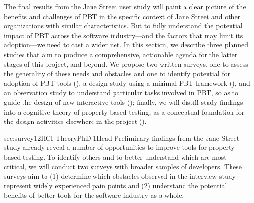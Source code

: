 
\iflater{}\fi


\iflater{}\fi

The final results from the Jane Street user study\iflater{}\fi{} will
paint a clear
picture of the benefits and challenges of PBT in the specific context
of Jane Street and other organizations with similar characteristics.  But to
fully understand the potential impact of PBT across the software
industry---and the factors that may limit its adoption---we need to
cast a wider net.
%
In this section, we describe three planned studies that aim
to produce a comprehensive, actionable
agenda for the latter stages of this project, and beyond.  We propose two
written surveys, one to assess the generality of these needs and obstacles
and one to identify potential for adoption of PBT tools
(), a design study using a minimal PBT
framework (), and an observation study to understand
particular tasks involved in PBT, so as to guide the design of new
interactive tools
(); finally, we will distill study findings
into a cognitive
theory of property-based testing, as a conceptual foundation for the
design activities elsewhere in the project ().

%
   {sec:survey}{1}{2}{HCI Theory}{PhD 1}{}{Head}
%
Preliminary findings from the Jane Street study already reveal a number of
opportunities to improve tools for property-based testing. To identify
others and to better understand which are most
critical, we will conduct two
surveys with broader samples of developers. These surveys aim to
(1) determine which obstacles observed in the interview
study\iflater{}\fi{}
represent widely experienced pain points and
(2) understand the potential benefits of better tools for the
software industry as a whole.


